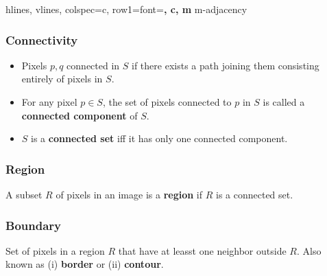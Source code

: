 \begin{minipage}{0.3\linewidth}
  \begin{tblr}{
    hlines, vlines,
    colspec={c},
    row{1}={font=\bfseries, c, m}
  }
    m-adjacency \\
  \end{tblr}
\end{minipage}

\subsubsection*{Connectivity}

\begin{itemize}
  \item Pixels $p, q$ connected in $S$ if there exists a path joining them consisting entirely of pixels in $S$.
  \item For any pixel $p \in S$, the set of pixels connected to $p$ in $S$ is called a \textbf{connected component} of $S$.
  \item $S$ is a \textbf{connected set} iff it has only one connected component.
\end{itemize}

\subsubsection*{Region}

A subset $R$ of pixels in an image is a \textbf{region} if $R$ is a connected set.


\subsubsection*{Boundary}

Set of pixels in a region $R$ that have at leasst one neighbor outside $R$. Also known as (i) \textbf{border} or (ii) \textbf{contour}.

